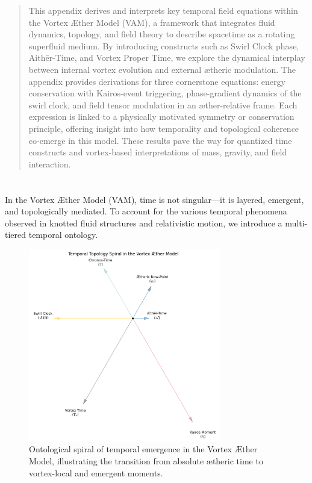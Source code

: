 \documentclass[12pt]{article}
\begin{document}
  \titlepageOpen

  \begin{abstract}

This appendix derives and interprets key temporal field equations within the Vortex Æther Model (VAM), a framework that integrates fluid dynamics, topology, and field theory to describe spacetime as a rotating superfluid medium. By introducing constructs such as Swirl Clock phase, Aithēr-Time, and Vortex Proper Time, we explore the dynamical interplay between internal vortex evolution and external ætheric modulation. The appendix provides derivations for three cornerstone equations: energy conservation with Kairos-event triggering, phase-gradient dynamics of the swirl clock, and field tensor modulation in an æther-relative frame. Each expression is linked to a physically motivated symmetry or conservation principle, offering insight into how temporality and topological coherence co-emerge in this model. These results pave the way for quantized time constructs and vortex-based interpretations of mass, gravity, and field interaction.

  \end{abstract}

  \titlepageClose
\fi

\section{\appendixtitle}

In the Vortex Æther Model (VAM), time is not singular—it is layered, emergent, and topologically mediated. To account for the various temporal phenomena observed in knotted fluid structures and relativistic motion, we introduce a multi-tiered temporal ontology.

  \begin{figure}[h]
    \centering
    \includegraphics[width=0.75\textwidth]{../images/TimeConstruct}
    \caption{Ontological spiral of temporal emergence in the Vortex Æther Model, illustrating the transition from absolute ætheric time to vortex-local and emergent moments.}
    \label{fig:temporal_swirl}
\end{figure}
\end{document}
